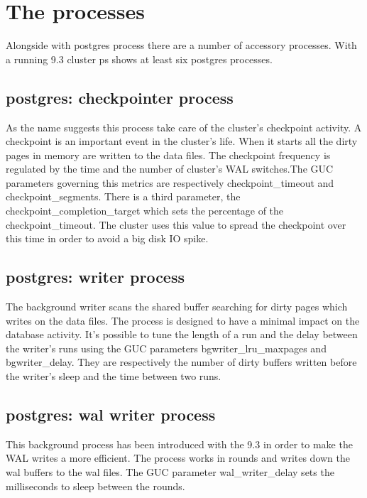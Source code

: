 \section{The processes}
\label{sec:PROCESSES}
Alongside with postgres process there are a number of accessory processes. With a running 9.3
cluster ps shows at least six postgres processes. 

\subsection{postgres: checkpointer process}
As the name suggests this process take care of the cluster's checkpoint activity.
A checkpoint is an important event in the cluster's life. When it starts all the dirty pages in
memory are written to the data files. The checkpoint frequency is regulated by the time and the
number of cluster's WAL switches.The GUC parameters governing this metrics are respectively
checkpoint\_timeout and checkpoint\_segments.
There is a third parameter, the checkpoint\_completion\_target
which sets the percentage of the checkpoint\_timeout. The cluster uses this value to spread the
checkpoint over this time in order to avoid a big disk IO spike.

\subsection{postgres: writer process}
The background writer scans the shared buffer searching for dirty pages which writes on the data
files. The process is designed to have a minimal impact on the database activity. It's possible to
tune the length of a run and the delay between the writer's runs using the GUC parameters
bgwriter\_lru\_maxpages and bgwriter\_delay.
They are respectively the number of dirty buffers written before the writer's sleep and the time
between two runs.

\subsection{postgres: wal writer process}
This background process has been introduced with the 9.3 in order to make the WAL writes a more
efficient. The process works in rounds and writes down the wal buffers to the  wal files. The GUC
parameter wal\_writer\_delay sets the milliseconds to sleep between the
rounds. 

